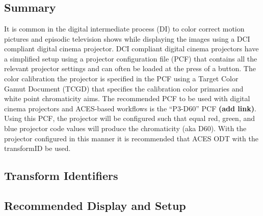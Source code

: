 \section[P3-D60]{\shortName{}}
\label{sec:odt-details-\id}

\subsection{Summary}
\label{subsec:summary-\id}

It is common in the digital intermediate process (DI) to color correct motion pictures and episodic television shows while displaying the images using a DCI compliant digital cinema projector. DCI compliant digital cinema projectors have a simplified setup using a projector configuration file (PCF) that contains all the relevant projector settings and can often be loaded at the press of a button. The color calibration the projector is specified in the PCF using a Target Color Gamut Document (TCGD) that specifies the calibration color primaries and white point chromaticity aims.  The recommended PCF to be used with digital cinema projectors and ACES-based workflows is the ``P3-D60'' PCF \textbf{(add link)}. Using this PCF, the projector will be configured such that equal red, green, and blue projector code values will produce the chromaticity  (aka D60). With the projector configured in this manner it is recommended that ACES ODT with the transformID \transformID{} be used.

\subsection{Transform Identifiers} 
\label{subsec:odt-ident-\id}

\subsection{Recommended Display and Setup}
\label{subsec:setup-\id}


